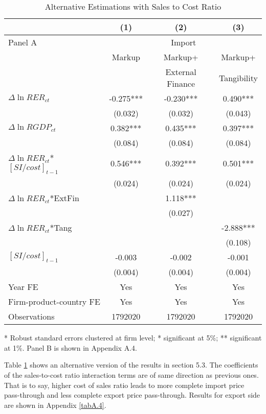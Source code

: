 \begin{table}[htbp]
	\centering
	\caption{Alternative Estimations with Sales to Cost Ratio}
	\begin{threeparttable}
	\begin{tabular}{lccc}
		\toprule
		& (1)   & (2)   & (3) \\
		\midrule
		Panel A & \multicolumn{3}{c}{Import} \\
		& Markup & Markup+ & Markup+ \\
		&       & External Finance & Tangibility \\
		\midrule
		$\Delta \ln RER_{ct}$ & -0.275*** & -0.230*** & 0.490*** \\
		& (0.032) & (0.032) & (0.043) \\
		$\Delta \ln RGDP_{ct}$ & 0.382*** & 0.435*** & 0.397*** \\
		& (0.084) & (0.084) & (0.084) \\
		$\Delta \ln RER_{ct}$*$[SI/cost]_{t-1}$ & 0.546*** & 0.392*** & 0.501*** \\
		& (0.024) & (0.024) & (0.024) \\
		$\Delta \ln RER_{ct}$*ExtFin &       & 1.118*** &  \\
		&       & (0.027) &  \\
		$\Delta \ln RER_{ct}$*Tang &       &       & -2.888*** \\
		&       &       & (0.108) \\
		$[SI/cost]_{t-1}$ & -0.003 & -0.002 & -0.001 \\
		& (0.004) & (0.004) & (0.004) \\
		Year FE  & Yes   & Yes   & Yes \\
		Firm-product-country FE & Yes   & Yes   & Yes \\
		Observations & 1792020 & 1792020 & 1792020 \\
		\bottomrule
	\end{tabular}
	\label{tab6.2}
	\begin{tablenotes}
		\footnotesize
		\item[*] Robust standard errors clustered at firm level; * significant at 5\%; ** significant at 1\%. Panel B is shown in Appendix A.4.
	\end{tablenotes}
\end{threeparttable}
\end{table}

Table \ref{tab6.2} shows an alternative version of the results in section 5.3. The coefficients of the sales-to-cost ratio interaction terms are of same direction as previous ones. That is to say, higher cost of sales ratio leads to more complete import price pass-through and less complete export price pass-through. Results for export side are shown in Appendix \ref{tabA.4}.

